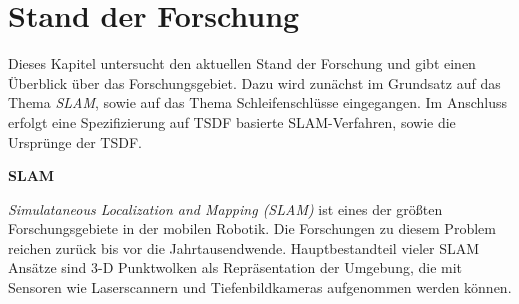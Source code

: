 \chapter{Stand der Forschung}\label{chapter:sdf}

Dieses Kapitel untersucht den aktuellen Stand der Forschung und gibt einen Überblick über das Forschungsgebiet. Dazu wird zunächst im Grundsatz auf das Thema \emph{SLAM}, sowie auf das Thema Schleifenschlüsse eingegangen. Im Anschluss erfolgt eine Spezifizierung auf TSDF basierte SLAM-Verfahren, sowie die Ursprünge der TSDF.

\textbf{SLAM}

\textit{Simulataneous Localization and Mapping (SLAM)} ist eines der größten Forschungsgebiete in der mobilen Robotik. Die Forschungen zu diesem Problem reichen zurück bis vor die Jahrtausendwende.
Hauptbestandteil vieler SLAM Ansätze sind 3-D Punktwolken als Repräsentation der Umgebung, die mit Sensoren wie Laserscannern und Tiefenbildkameras aufgenommen werden können.

